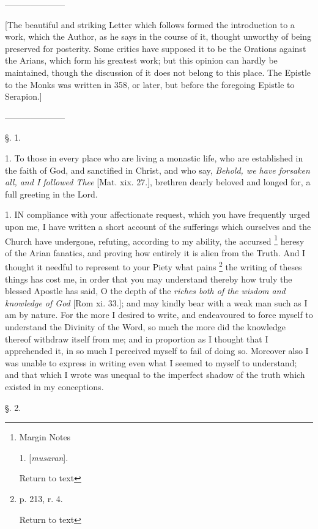 
———————

[The beautiful and striking Letter which follows
formed the introduction to a work, which the Author, as he says in the
course of it, thought unworthy of being preserved for posterity. Some
critics have supposed it to be the Orations against the Arians, which
form his greatest work; but this opinion can hardly be maintained,
though the discussion of it does not belong to this place. The Epistle
to the Monks was written in 358, or later, but before the foregoing
Epistle to Serapion.]

———————

§. 1.

1. To those in every place who are living a
monastic life, who are established in the faith of God, and sanctified
in Christ, and who say, \emph{Behold, we have forsaken all, and I
followed Thee} [Mat. xix. 27.], brethren dearly beloved and longed
for, a full greeting in the Lord.

1. IN
compliance with your affectionate request, which you have frequently
urged upon me, I have written a short account of the sufferings which
ourselves and the Church have undergone, refuting, according to my
ability, the accursed \footnote{Margin Notes

1. [\emph{musaran}].

Return to text}
heresy of the Arian fanatics, and proving how entirely it is alien
from the Truth. And I thought it needful to represent to your Piety
what pains \footnote{p. 213, r. 4.

Return to text} the writing
of theses things has cost me, in order that you may understand thereby
how truly the blessed Apostle has said, O the depth of the \emph{riches
both of the wisdom and knowledge of God} [Rom xi. 33.]; and may
kindly bear with a weak man such as I am by nature. For the more I
desired to write, and endeavoured to force myself to understand the
Divinity of the Word, so much the more did the knowledge thereof
withdraw itself from me; and in proportion as I thought that I
apprehended it, in so much I perceived myself to fail of doing so.
Moreover also I was unable to express in writing even what I seemed to
myself to understand; and that which I wrote was unequal to the
imperfect shadow of the truth which existed in my conceptions.

§. 2.

